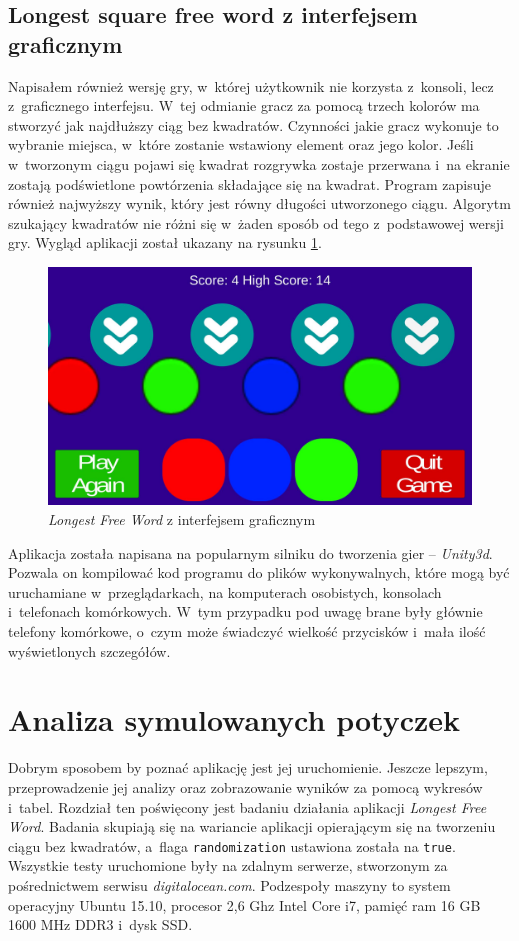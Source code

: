 \documentclass[document]{xmgr}
\begin{document}
\section{Longest square free word z interfejsem graficznym}
Napisałem również wersję gry, w~której użytkownik nie korzysta z~konsoli, lecz z~graficznego interfejsu. W~tej odmianie gracz za pomocą trzech kolorów ma stworzyć jak najdłuższy ciąg bez kwadratów. Czynności jakie gracz wykonuje to wybranie miejsca, w~które zostanie wstawiony element oraz jego kolor. Jeśli w~tworzonym ciągu pojawi się kwadrat rozgrywka zostaje przerwana i~na ekranie zostają podświetlone powtórzenia składające się na kwadrat. Program zapisuje również najwyższy wynik, który jest równy długości utworzonego ciągu. Algorytm szukający kwadratów nie różni się w~żaden sposób od tego z~podstawowej wersji gry. Wygląd aplikacji został ukazany na rysunku \ref{fig:thueMobile}.

\begin{figure}[tbh]
    \centering
    \includegraphics[width = \textwidth]{images/thueMobile}
    \caption{\emph{Longest Free Word} z interfejsem graficznym}
    \label{fig:thueMobile}
\end{figure}

Aplikacja została napisana na popularnym silniku do tworzenia gier -- \emph{Unity3d}. Pozwala on kompilować kod programu do plików wykonywalnych, które mogą być uruchamiane w~przeglądarkach, na komputerach osobistych, konsolach i~telefonach komórkowych. W~tym przypadku pod uwagę brane były głównie telefony komórkowe, o~czym może świadczyć wielkość przycisków i~mała ilość wyświetlonych szczegółów.


\chapter{Analiza symulowanych potyczek} 
Dobrym sposobem by poznać aplikację jest jej uruchomienie. Jeszcze lepszym, przeprowadzenie jej analizy oraz zobrazowanie wyników za pomocą wykresów i~tabel. Rozdział ten poświęcony jest badaniu działania aplikacji \emph{Longest Free Word}. Badania skupiają się na wariancie aplikacji opierającym się na tworzeniu ciągu bez kwadratów, a~flaga \texttt{randomization} ustawiona została na \texttt{true}. Wszystkie testy uruchomione były na zdalnym serwerze, stworzonym za pośrednictwem serwisu \emph{digitalocean.com}. Podzespoły maszyny to system operacyjny Ubuntu 15.10, procesor 2,6 Ghz Intel Core i7, pamięć ram 16 GB 1600 MHz DDR3 i~dysk SSD.
\end{document}
